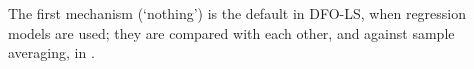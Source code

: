 The first mechanism (`nothing') is the default in DFO-LS, when regression models are used; they are compared with each other, and against sample averaging, in .

% 


